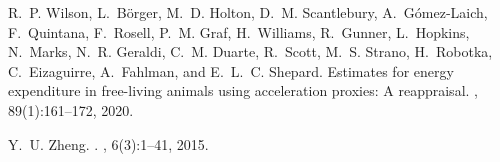 \documentclass[a4paper,12pt]{article}
\begin{document}
\begin{thebibliography}{10}
	R.~P. Wilson, L.~Börger, M.~D. Holton, D.~M. Scantlebury, A.~Gómez‐Laich,
	F.~Quintana, F.~Rosell, P.~M. Graf, H.~Williams, R.~Gunner, L.~Hopkins,
	N.~Marks, N.~R. Geraldi, C.~M. Duarte, R.~Scott, M.~S. Strano, H.~Robotka,
	C.~Eizaguirre, A.~Fahlman, and E.~L.~C. Shepard.
	\newblock Estimates for energy expenditure in free-living animals using
	acceleration proxies: {A} reappraisal.
	, 89(1):161--172, 2020.
	
	Y.~U. Zheng.
	.
	, 6(3):1--41, 2015.
	
\end{thebibliography}
\end{document}
